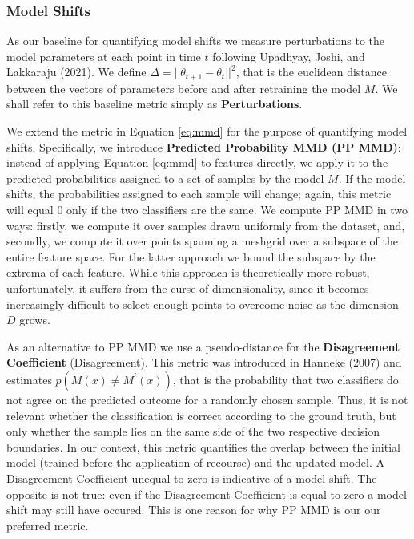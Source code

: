 \documentclass[conference,final,]{IEEEtran}
\begin{document}
\hypertarget{model-shifts}{%
\subsubsection{Model Shifts}\label{model-shifts}}

As our baseline for quantifying model shifts we measure perturbations to the model parameters at each point in time \(t\) following Upadhyay, Joshi, and Lakkaraju (2021). We define \(\Delta=||\theta_{t+1}-\theta_{t}||^2\), that is the euclidean distance between the vectors of parameters before and after retraining the model \(M\). We shall refer to this baseline metric simply as \textbf{Perturbations}.

We extend the metric in Equation \eqref{eq:mmd} for the purpose of quantifying model shifts. Specifically, we introduce \textbf{Predicted Probability MMD (PP MMD)}: instead of applying Equation \eqref{eq:mmd} to features directly, we apply it to the predicted probabilities assigned to a set of samples by the model \(M\). If the model shifts, the probabilities assigned to each sample will change; again, this metric will equal 0 only if the two classifiers are the same. We compute PP MMD in two ways: firstly, we compute it over samples drawn uniformly from the dataset, and, secondly, we compute it over points spanning a meshgrid over a subspace of the entire feature space. For the latter approach we bound the subspace by the extrema of each feature. While this approach is theoretically more robust, unfortunately, it suffers from the curse of dimensionality, since it becomes increasingly difficult to select enough points to overcome noise as the dimension \(D\) grows.

As an alternative to PP MMD we use a pseudo-distance for the \textbf{Disagreement Coefficient} (Disagreement). This metric was introduced in Hanneke (2007) and estimates \(p(M(x) \neq M^\prime(x))\), that is the probability that two classifiers do not agree on the predicted outcome for a randomly chosen sample. Thus, it is not relevant whether the classification is correct according to the ground truth, but only whether the sample lies on the same side of the two respective decision boundaries. In our context, this metric quantifies the overlap between the initial model (trained before the application of recourse) and the updated model. A Disagreement Coefficient unequal to zero is indicative of a model shift. The opposite is not true: even if the Disagreement Coefficient is equal to zero a model shift may still have occured. This is one reason for why PP MMD is our our preferred metric.
\end{document}
